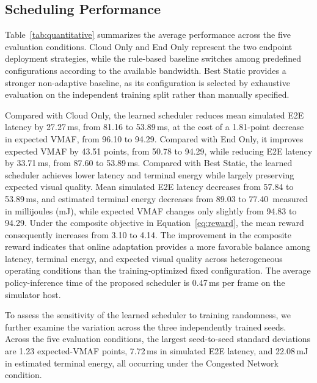 \documentclass[10pt,journal,compsoc]{IEEEtran}
\begin{document}
\subsection{Scheduling Performance}
\label{sec:scheduling_performance}

Table~\ref{tab:quantitative} summarizes the average performance across the five evaluation conditions. Cloud Only and End Only represent the two endpoint deployment strategies, while the rule-based baseline switches among predefined configurations according to the available bandwidth. Best Static provides a stronger non-adaptive baseline, as its configuration is selected by exhaustive evaluation on the independent training split rather than manually specified. 

Compared with Cloud Only, the learned scheduler reduces mean simulated E2E latency by 27.27\,ms, from 81.16 to 53.89\,ms, at the cost of a 1.81-point decrease in expected VMAF, from 96.10 to 94.29. Compared with End Only, it improves expected VMAF by 43.51 points, from 50.78 to 94.29, while reducing E2E latency by 33.71\,ms, from 87.60 to 53.89\,ms. Compared with Best Static, the learned scheduler achieves lower latency and terminal energy while largely preserving expected visual quality. Mean simulated E2E latency decreases from 57.84 to 53.89\,ms, and estimated terminal energy decreases from 89.03 to 77.40\, measured in millijoules (mJ), while expected VMAF changes only slightly from 94.83 to 94.29. Under the composite objective in Equation~\ref{eq:reward}, the mean reward consequently increases from 3.10 to 4.14. The improvement in the composite reward indicates that online adaptation provides a more favorable balance among latency, terminal energy, and expected visual quality across heterogeneous operating conditions than the training-optimized fixed configuration. The average policy-inference time of the proposed scheduler is 0.47\,ms per frame on the simulator host.

To assess the sensitivity of the learned scheduler to training randomness, we further examine the variation across the three independently trained seeds. Across the five evaluation conditions, the largest seed-to-seed standard deviations are 1.23 expected-VMAF points, 7.72\,ms in simulated E2E latency, and 22.08\,mJ in estimated terminal energy, all occurring under the Congested Network condition.
\end{document}

